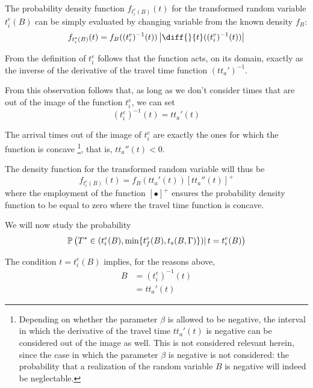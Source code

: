 The probability density function \(f_{t_i^e(B)}(t)\) for the transformed random variable \(t_i^e(B)\) can be simply evaluated by changing variable from the known density \(f_B\):
\begin{equation}
  \label{eq:pdf-b-change-var}
  f_{t_i^e(B)}(t) = f_B((t_i^e)^{-1}(t)) \left| \diff{}{t}((t_i^e)^{-1}(t)) \right|
\end{equation}

From the definition of \(t_i^e\) follows that the function acts,
on its domain, exactly as the inverse of the derivative of the travel time function \((tt_a')^{-1}\).

From this observation follows that, as long as we don't consider times that are out of the image of the function \(t_i^e\),
we can set
\begin{equation*}
  (t_i^e)^{-1}(t) = tt_a'(t)
\end{equation*}

The arrival times out of the image of \(t_i^e\) are exactly the ones for which the function is concave
\footnote{
  Depending on whether the parameter \(\beta\) is allowed to be negative,
  the interval in which the derivative of the travel time \(tt_a'(t)\) is negative can be considered out of the image as well.
  This is not considered relevant herein,
  since the case in which the parameter \(\beta\) is negative is not considered:
  the probability that a realization of the random variable \(B\) is negative will indeed be neglectable.
},
that is, \(tt_a''(t) < 0\).

The density function for the transformed random variable will thus be
\begin{equation}
  \label{eq:pdf-b-changed-var}
  f_{t_i^e(B)}(t) = f_B(tt_a'(t)) [tt_a''(t)]^+
\end{equation}
where the employment of the function \([\bullet]^+\) ensures the probability density function to be equal to zero where the travel time function is concave.

We will now study the probability
\begin{equation*}
  \mathbb{P}\left(T^* \in (t_i^e(B), \min\{t_f^e(B), t_s(B, \Gamma)\})|\, t = t_i^e(B)\right)
\end{equation*}

The condition \(t = t_i^e(B)\) implies, for the reasons above,
\begin{align*}
  B & = (t_i^e)^{-1}(t) \\
    & = tt_a'(t)
\end{align*}

